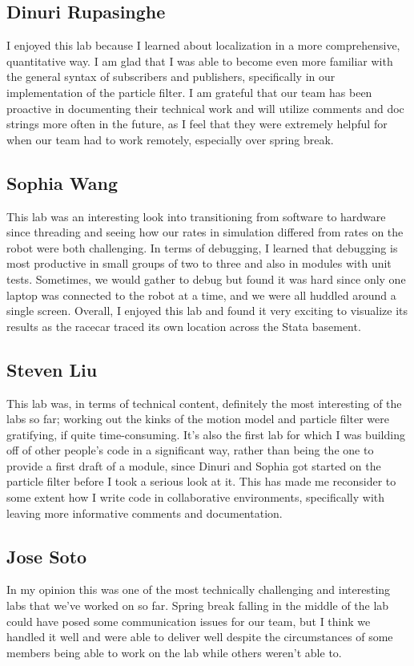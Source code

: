 \documentclass{article}
\begin{document}
\subsection{Dinuri Rupasinghe}
I enjoyed this lab because I learned about localization in a more comprehensive, quantitative way. I am glad that I was able to become even more familiar with the general syntax of subscribers and publishers, specifically in our implementation of the particle filter. I am grateful that our team has been proactive in documenting their technical work and will utilize comments and doc strings more often in the future, as I feel that they were extremely helpful for when our team had to work remotely, especially over spring break.

\subsection{Sophia Wang}
This lab was an interesting look into transitioning from software to hardware since threading and seeing how our rates in simulation differed from rates on the robot were both challenging. In terms of debugging, I learned that debugging is most productive in small groups of two to three and also in modules with unit tests. Sometimes, we would gather to debug but found it was hard since only one laptop was connected to the robot at a time, and we were all huddled around a single screen. Overall, I enjoyed this lab and found it very exciting to visualize its results as the racecar traced its own location across the Stata basement.

\subsection{Steven Liu}
This lab was, in terms of technical content, definitely the most interesting of the labs so far; working out the kinks of the motion model and particle filter were gratifying, if quite time-consuming. It's also the first lab for which I was building off of other people's code in a significant way, rather than being the one to provide a first draft of a module, since Dinuri and Sophia got started on the particle filter before I took a serious look at it. This has made me reconsider to some extent how I write code in collaborative environments, specifically with leaving more informative comments and documentation.

\subsection{Jose Soto}
In my opinion this was one of the most technically challenging and interesting labs that we've worked on so far. Spring break falling in the middle of the lab could have posed some communication issues for our team, but I think we handled it well and were able to deliver well despite the circumstances of some members being able to work on the lab while others weren't able to. 
\newpage 
\end{document}
